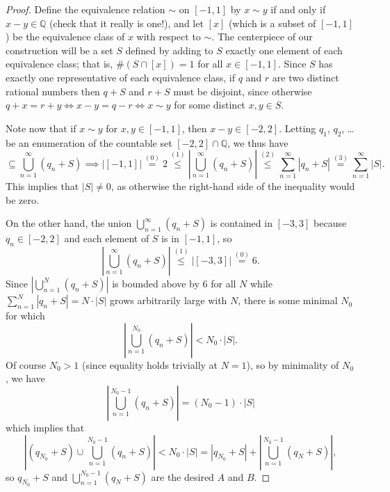 \documentclass[11pt]{scrartcl}
\providecommand{\QQ}{\mathbb Q}
\providecommand{\abs}[1]{\left\lvert #1\right\rvert}
\begin{document}
\begin{proof}
    Define the equivalence relation $\sim$ on $[-1,1]$ by
    $x\sim y$ if and only if $x-y\in\QQ$ (check that it really is one!),
    and let $[x]$ (which is a subset of $[-1,1]$)
    be the equivalence class of $x$ with respect to $\sim$.
    The centerpiece of our construction will be a set $S$
    defined by adding to $S$ exactly one element of each equivalence class;
    that is, $\#(S\cap [x]) = 1$ for all $x\in[-1,1]$.
    Since $S$ has exactly one representative of each equivalence class,
    if $q$ and $r$ are two distinct rational numbers
    then $q+S$ and $r+S$ must be disjoint, since otherwise
    $q+x = r+y \iff x-y = q-r \iff x\sim y$ for some distinct $x,y\in S$.

    Note now that if $x\sim y$ for $x,y\in[-1,1]$, then $x-y\in[-2,2]$.
    Letting $q_1$, $q_2$, \dots be an enumeration of
    the countable set $[-2,2]\cap\QQ$, we thus have
    \begin{equation*}
	[-1,1]\subseteq\bigcup_{n=1}^\infty (q_n + S)
	\implies \abs{[-1,1]} \overset{(0)} = 2
	\overset{(1)}\le \abs{\bigcup_{n=1}^\infty (q_n + S)}
	\overset{(2)}\le \sum_{n=1}^\infty\abs{q_n+S}
	\overset{(3)}= \sum_{n=1}^\infty\abs{S}.
    \end{equation*}
    This implies that $\abs S\ne 0$, as otherwise the right-hand side
    of the inequality would be zero.

    On the other hand, the union $\bigcup_{n=1}^\infty (q_n + S)$
    is contained in $[-3,3]$ because $q_n\in[-2,2]$
    and each element of $S$ is in $[-1,1]$, so
    \begin{equation*}
	\abs{\bigcup_{n=1}^\infty (q_n + S)} \overset{(1)}\le
	\abs{[-3,3]} \overset{(0)}= 6.
    \end{equation*}
    Since $\abs{\bigcup_{n=1}^N (q_n + S)}$ is bounded above by $6$ for all $N$
    while $\sum_{n=1}^N \abs{q_n+S} = N\cdot\abs S$
    grows arbitrarily large with $N$, there is some minimal $N_0$ for which
    \begin{equation*}
        \abs{\bigcup_{n=1}^{N_0} (q_n + S)} < N_0\cdot \abs S.
    \end{equation*}
    Of course $N_0 > 1$ (since equality holds trivially at $N=1$),
    so by minimality of $N_0$, we have
    \begin{equation*}
	\abs{\bigcup_{n=1}^{N_0-1}(q_n + S)} = (N_0-1)\cdot\abs S
    \end{equation*}
    which implies that
    \begin{equation*}
	\abs{(q_{N_0} + S)\cup \bigcup_{n=1}^{N_0-1}(q_n + S)}
	< N_0\cdot\abs S =
	\abs{q_{N_0} + S} + \abs{\bigcup_{n=1}^{N_0-1} (q_N + S)},
    \end{equation*}
    so $q_{N_0} + S$ and $\bigcup_{n=1}^{N_0-1}(q_N+S)$ are
    the desired $A$ and $B$.
\end{proof}
\end{document}
